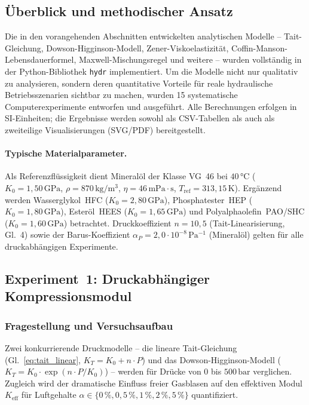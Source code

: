﻿\documentclass[a4paper,12pt]{scrreprt}
\theoremstyle{definition}
\begin{document}
\subsection{Überblick und methodischer Ansatz}
\label{sec:exp_ueberblick}

Die in den vorangehenden Abschnitten entwickelten analytischen Modelle --
Tait-Gleichung, Dowson-Higginson-Modell, Zener-Viskoelastizität, Coffin-Manson-
Lebensdauerformel, Maxwell-Mischungsregel und weitere -- wurden vollständig in
der Python-Bibliothek \texttt{hydr} implementiert.
Um die Modelle nicht nur qualitativ zu analysieren, sondern deren quantitative
Vorteile für reale hydraulische Betriebsszenarien sichtbar zu machen, wurden
15 systematische Computerexperimente entworfen und ausgeführt.
Alle Berechnungen erfolgen in SI-Einheiten; die Ergebnisse werden sowohl
als CSV-Tabellen als auch als zweiteilige Visualisierungen (SVG/PDF)
bereitgestellt.

\paragraph{Typische Materialparameter.}
Als Referenzflüssigkeit dient Mineralöl der Klasse VG~46 bei $40\, °\mathrm{C}$
($K_0 = 1{,}50\,\mathrm{GPa}$, $\rho = 870\,\mathrm{kg/m^3}$,
$\eta = 46\,\mathrm{mPa\cdot s}$, $T_{\mathrm{ref}} = 313{,}15\,\mathrm{K}$).
Ergänzend werden Wasserglykol~HFC ($K_0 = 2{,}80\,\mathrm{GPa}$),
Phosphatester~HEP ($K_0 = 1{,}80\,\mathrm{GPa}$), Esteröl~HEES
($K_0 = 1{,}65\,\mathrm{GPa}$) und Polyalphaolefin~PAO/SHC
($K_0 = 1{,}60\,\mathrm{GPa}$) betrachtet.
Druckkoeffizient $n = 10{,}5$ (Tait-Linearisierung, Gl.~4) sowie der
Barus-Koeffizient $\alpha_P = 2{,}0 \cdot 10^{-8}\,\mathrm{Pa^{-1}}$
(Mineralöl) gelten für alle druckabhängigen Experimente.

\subsection{Experiment~1: Druckabhängiger Kompressionsmodul}
\label{sec:exp01}

\subsubsection*{Fragestellung und Versuchsaufbau}

Zwei konkurrierende Druckmodelle -- die lineare Tait-Gleichung
(Gl.~\ref{eq:tait_linear}, $K_T = K_0 + n\cdot P$) und das
Dowson-Higginson-Modell ($K_T = K_0 \cdot \exp(n\cdot P / K_0)$) -- werden
für Drücke von $0$ bis $500\,\mathrm{bar}$ verglichen.
Zugleich wird der dramatische Einfluss freier Gasblasen auf den effektiven
Modul $K_{\mathrm{eff}}$ für Luftgehalte
$\alpha \in \{0\,\%, 0{,}5\,\%, 1\,\%, 2\,\%, 5\,\%\}$ quantifiziert.
\end{document}
